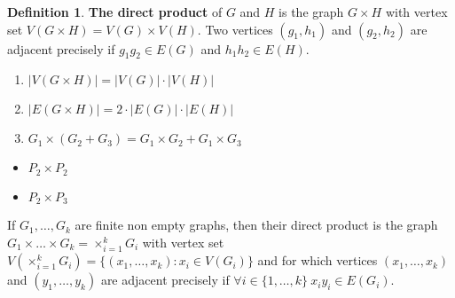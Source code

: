 \documentclass{article}
\theoremstyle{definition}
\newtheorem{dd}{Definition}[section]
\begin{document}
\begin{dd}
    \textbf{The direct product} of $G$ and $H$ is the graph $G \times H$ with vertex set $V(G \times H) = V(G) \times V(H)$. Two vertices $(g_1, h_1)$ and $(g_2, h_2)$ are adjacent precisely if $g_1g_2 \in E(G)$ and $h_1h_2 \in E(H)$.
    \begin{enumerate}
        \item $|V(G \times H)| = |V(G)| \cdot |V(H)|$
        \item $|E(G \times H)| = 2 \cdot |E(G)| \cdot |E(H)|$
        \item $G_1 \times (G_2 + G_3) = G_1 \times G_2 + G_1 \times G_3$
    \end{enumerate}
    \begin{multicols}{2}
    \begin{itemize}
        \item {
            $P_2 \times P_2$ \par
        }
        \item {
            $P_2 \times P_3$ \par
        }
    \end{itemize}
    \end{multicols}
\end{dd}

If $G_1, \dots, G_k$ are finite non empty graphs, then their direct product is the graph $G_1 \times \dots \times G_k = \times_{i = 1}^k G_i$ with vertex set $V(\times_{i = 1}^k G_i) = \{(x_1, \dots, x_k): x_i \in V(G_i)\}$ and for which vertices $(x_1, \dots, x_k)$ and $(y_1, \dots, y_k)$ are adjacent precisely if $\forall i \in \{1, \dots, k\}\ x_iy_i \in E(G_i)$.
\end{document}

